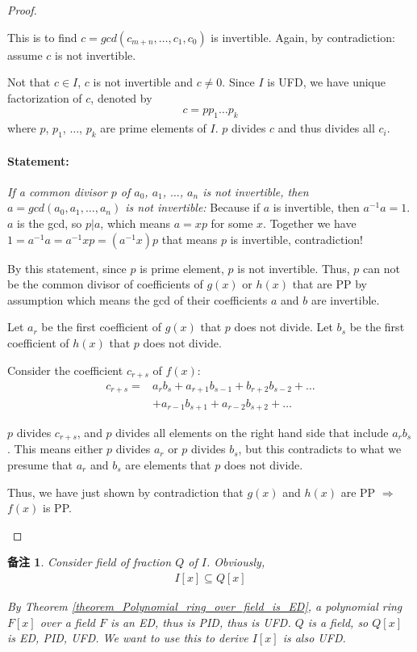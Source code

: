 \documentclass[utf8]{ctexbook}
\newtheorem{memo}{备注}[section]
\begin{document}
\begin{proof}
\begin{enumerate}
{This is to find $c = gcd(c_{m+n}, \ldots, c_1, c_0)$ is invertible. Again, by contradiction: assume $c$ is not invertible. 

Not that $c \in I$, $c$ is not invertible and $c \neq 0$. Since $I$ is UFD, we have unique factorization of $c$, denoted by
\begin{align*}
c = p p_1 \ldots p_k
\end{align*} 
where $p$, $p_1$, $\ldots$, $p_k$ are prime elements of $I$. $p$ divides $c$ and thus divides all $c_i$. 

\paragraph{Statement:} \emph{If a common divisor $p$ of $a_0$, $a_1$, $\ldots$, $a_n$ is not invertible, then $a = gcd(a_0, a_1, \ldots, a_n)$ is not invertible:} Because
if $a$ is invertible, then $a^{-1}a = 1$. $a$ is the gcd, so $p | a$, which means $a = xp$ for some $x$. Together we have $1 =  a^{-1} a = a^{-1} x p = (a^{-1}x ) p$ that means $p$ is invertible, contradiction!

By this statement, since $p$ is prime element, $p$ is not invertible. Thus, $p$ can not be the common divisor of coefficients of $g(x)$ or $h(x)$ that are PP by assumption which means the gcd of their coefficients $a$ and $b$ are invertible.

Let $a_r$ be the first coefficient of $g(x)$ that $p$ does not divide. Let $b_s$ be the first coefficient of $h(x)$ that $p$ does not divide.

Consider the coefficient $c_{r+s}$ of $f(x)$:
\begin{align*}
c_{r+s} = & a_r b_s + a_{r+1} b_{s-1} + b_{r+2} b_{s-2} + \ldots \\
 & + a_{r-1} b_{s+1} + a_{r-2} b_{s+2} + \ldots
\end{align*}

$p$ divides $c_{r+s}$, and $p$ divides all elements on the right hand side that include $a_r b_s$. This means either $p$ divides $a_r$ or $p$ divides $b_s$, but this contradicts to what we presume that $a_r$ and $b_s$ are elements that $p$ does not divide.

Thus, we have just shown by contradiction that $g(x)$ and $h(x)$ are PP $\Longrightarrow$ $f(x)$ is PP.
}
\end{enumerate}
\end{proof}


\begin{memo}
Consider field of fraction $Q$ of $I$. Obviously,
\begin{align*}
I[x] \subseteq Q[x]
\end{align*}

By Theorem \ref{theorem_Polynomial_ring_over_field_is_ED}, a polynomial ring $F[x]$ over a field $F$ is an ED, thus is PID, thus is UFD. $Q$ is a field, so $Q[x]$ is ED, PID, UFD. We want to use this to derive $I[x]$ is also UFD.

\end{memo}
\end{document}
